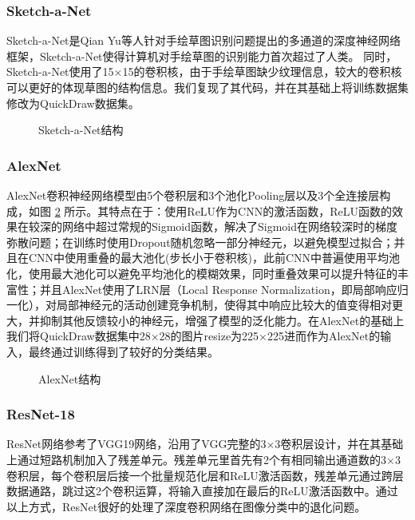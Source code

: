 \subsubsection{Sketch-a-Net}

Sketch-a-Net\cite{sketchanet}是Qian Yu等人针对手绘草图识别问题提出的多通道的深度神经网络框架，Sketch-a-Net使得计算机对手绘草图的识别能力首次超过了人类。
同时，Sketch-a-Net使用了15×15的卷积核，由于手绘草图缺少纹理信息，较大的卷积核可以更好的体现草图的结构信息。我们复现了其代码，并在其基础上将训练数据集修改为QuickDraw数据集。

\begin{figure}[htp]
    \centering
    
    \caption{Sketch-a-Net结构}
    \label{fig:sketch-a-net}
\end{figure}
\subsubsection{AlexNet}
AlexNet\cite{alexnet}卷积神经网络模型由5个卷积层和3个池化Pooling层以及3个全连接层构成，如图 \ref{fig:Alexnet} 所示。其特点在于：使用ReLU作为CNN的激活函数，ReLU函数的效果在较深的网络中超过常规的Sigmoid函数，解决了Sigmoid在网络较深时的梯度弥散问题；在训练时使用Dropout随机忽略一部分神经元，以避免模型过拟合；并且在CNN中使用重叠的最大池化(步长小于卷积核)，此前CNN中普遍使用平均池化，使用最大池化可以避免平均池化的模糊效果，同时重叠效果可以提升特征的丰富性；并且AlexNet使用了LRN层（Local Response Normalization，即局部响应归一化），对局部神经元的活动创建竞争机制，使得其中响应比较大的值变得相对更大，并抑制其他反馈较小的神经元，增强了模型的泛化能力。在AlexNet的基础上我们将QuickDraw数据集中28×28的图片resize为225×225进而作为AlexNet的输入，最终通过训练得到了较好的分类结果。
\begin{figure}[htp]
    \centering
    {
    
    }
    
    \caption{AlexNet结构}
    \label{fig:Alexnet}
\end{figure}
\subsubsection{ResNet-18}
ResNet\cite{resnet}网络参考了VGG19网络，沿用了VGG完整的3×3卷积层设计，并在其基础上通过短路机制加入了残差单元。残差单元里首先有2个有相同输出通道数的3×3卷积层，每个卷积层后接一个批量规范化层和ReLU激活函数，残差单元通过跨层数据通路，跳过这2个卷积运算，将输入直接加在最后的ReLU激活函数中。通过以上方式，ResNet很好的处理了深度卷积网络在图像分类中的退化问题。

